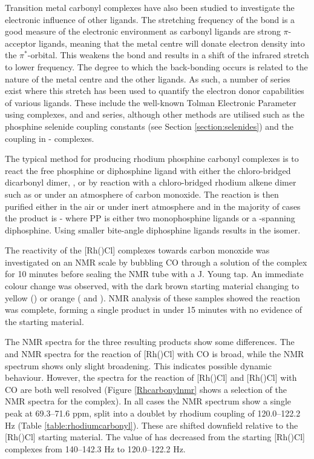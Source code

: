 Transition metal carbonyl complexes have also been studied to investigate the electronic influence of other ligands.  The stretching frequency of the  bond is a good measure of the electronic environment as carbonyl ligands are strong $\pi$-acceptor ligands, meaning that the metal centre will donate electron density into the $\pi^*$-orbital.  This weakens the  bond and results in a shift of the infrared  stretch to lower frequency.  The degree to which the back-bonding occurs is related to the nature of the metal centre and the other ligands.  As such, a number of series exist where this stretch has been used to quantify the electron donor capabilities of various ligands.  These include the well-known Tolman Electronic Parameter using \ce{[Ni(CO)3L]} complexes,\cite{Tolman1977, Tolman1970} and \ce{[Mo(CO)5L]} and \ce{[Rh(CO)ClL2]} series,\cite{Banger2009}  although other methods are utilised such as the phosphine selenide coupling constants (see Section \ref{section:selenides}) and the \JPtP{} coupling in \cis-\ce{[PtCl2P2]} complexes.\cite{Pregosin2012}

The typical method for producing rhodium phosphine carbonyl complexes is to react the free phosphine or diphosphine ligand with either the chloro-bridged dicarbonyl dimer, , or by reaction with a chloro-bridged rhodium alkene dimer such as  or  under an atmosphere of carbon monoxide.  The reaction is then purified either in the air or under inert atmosphere and in the majority of cases the product is \trans-\ce{[Rh(CO)(PP)Cl]} where PP is either two monophosphine ligands or a \trans-spanning diphosphine.  Using smaller bite-angle diphosphine ligands results in the \cis{} isomer.  

The reactivity of the [Rh(\tBuxantphosk)Cl] complexes towards carbon monoxide was investigated on an NMR scale by bubbling CO through a  solution of the complex for 10 minutes before sealing the NMR tube with a J. Young tap.  An immediate colour change was observed, with the dark brown starting material changing to yellow (\tBusixantphos) or orange (\tButhixantphos{} and \tBuxantphos).  NMR analysis of these samples showed the reaction was complete, forming a single product in under 15 minutes with no evidence of the starting material.

The NMR spectra for the three resulting products show some differences.  The \proton{} and \carbon{} NMR spectra for the reaction of [Rh(\tButhixantphosk)Cl] with CO is broad, while the \phosphorus{} NMR spectrum shows only slight broadening.  This indicates possible dynamic behaviour.  However, the spectra for the reaction of [Rh(\tBusixantphosk)Cl] and [Rh(\tBuxantphosk)Cl] with CO are both well resolved (Figure \ref{Rhcarbonylnmr} shows a selection of the NMR spectra for the \tBuxantphos{} complex).  In all cases the \phosphorus{} NMR spectrum show a single peak at 69.3--71.6 ppm, split into a doublet by rhodium coupling of 120.0--122.2 Hz (Table \ref{table:rhodiumcarbonyl}).  These are shifted downfield relative to the [Rh(\tBuxantphosk)Cl] starting material.  The value of \JRhP{} has decreased from the starting [Rh(\tBuxantphosk)Cl] complexes from 140--142.3 Hz to 120.0--122.2 Hz.

